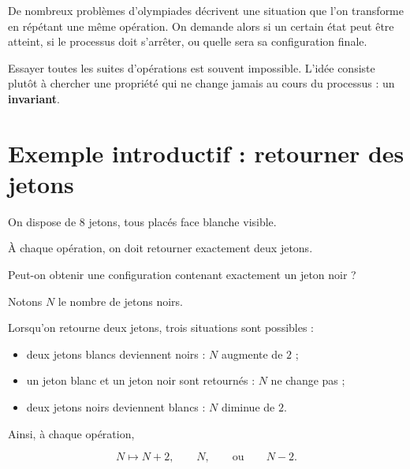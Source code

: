 \documentclass[11pt]{article}
\begin{document}

De nombreux problèmes d'olympiades décrivent une situation que l'on transforme
en répétant une même opération. On demande alors si un certain état peut être
atteint, si le processus doit s'arrêter, ou quelle sera sa configuration finale.

Essayer toutes les suites d'opérations est souvent impossible. L'idée consiste
plutôt à chercher une propriété qui ne change jamais au cours du processus :
un \textbf{invariant}.

\section{Exemple introductif : retourner des jetons}\label{sec:exemple-introductif}

On dispose de \(8\) jetons, tous placés face blanche visible.

À chaque opération, on doit retourner exactement deux jetons.

Peut-on obtenir une configuration contenant exactement un jeton noir ?

\begin{center}
\end{center}

Notons \(N\) le nombre de jetons noirs.

Lorsqu'on retourne deux jetons, trois situations sont possibles :

\begin{itemize}
    \item deux jetons blancs deviennent noirs : \(N\) augmente de \(2\) ;
    \item un jeton blanc et un jeton noir sont retournés : \(N\) ne change pas ;
    \item deux jetons noirs deviennent blancs : \(N\) diminue de \(2\).
\end{itemize}

Ainsi, à chaque opération,

\[
N\longmapsto N+2,\qquad N,\qquad\text{ou}\qquad N-2.
\]
\end{document}
